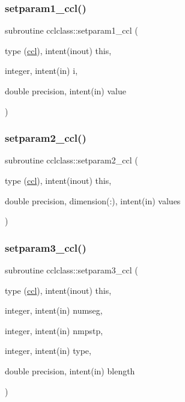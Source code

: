\subsubsection{\texorpdfstring{setparam1\_ccl()}{setparam1\_ccl()}}
{\footnotesize\ttfamily subroutine cclclass\+::setparam1\+\_\+ccl (\begin{DoxyParamCaption}\item[{type (\mbox{\hyperlink{namespacecclclass_structcclclass_1_1ccl}{ccl}}), intent(inout)}]{this,  }\item[{integer, intent(in)}]{i,  }\item[{double precision, intent(in)}]{value }\end{DoxyParamCaption})}

\mbox{\label{namespacecclclass_a7bc5a807438db526489d8773fa168375}} 
\subsubsection{\texorpdfstring{setparam2\_ccl()}{setparam2\_ccl()}}
{\footnotesize\ttfamily subroutine cclclass\+::setparam2\+\_\+ccl (\begin{DoxyParamCaption}\item[{type (\mbox{\hyperlink{namespacecclclass_structcclclass_1_1ccl}{ccl}}), intent(inout)}]{this,  }\item[{double precision, dimension(\+:), intent(in)}]{values }\end{DoxyParamCaption})}

\mbox{\label{namespacecclclass_a5a90756fe0684d2f29121a368dbef489}} 
\subsubsection{\texorpdfstring{setparam3\_ccl()}{setparam3\_ccl()}}
{\footnotesize\ttfamily subroutine cclclass\+::setparam3\+\_\+ccl (\begin{DoxyParamCaption}\item[{type (\mbox{\hyperlink{namespacecclclass_structcclclass_1_1ccl}{ccl}}), intent(inout)}]{this,  }\item[{integer, intent(in)}]{numseg,  }\item[{integer, intent(in)}]{nmpstp,  }\item[{integer, intent(in)}]{type,  }\item[{double precision, intent(in)}]{blength }\end{DoxyParamCaption})}



